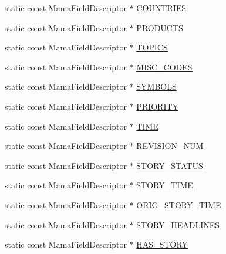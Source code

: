 \begin{CompactItemize}
\item 
static const Mama\-Field\-Descriptor $\ast$ \hyperlink{classWombat_1_1MamdaNewsFields_f8824103cdea9bf6ae34673a62955275}{COUNTRIES}
\item 
static const Mama\-Field\-Descriptor $\ast$ \hyperlink{classWombat_1_1MamdaNewsFields_2c2cb7d80e836bbde40631da69c58887}{PRODUCTS}
\item 
static const Mama\-Field\-Descriptor $\ast$ \hyperlink{classWombat_1_1MamdaNewsFields_03e2ddbd4bf6bd7ff68b52d72f7c8bcf}{TOPICS}
\item 
static const Mama\-Field\-Descriptor $\ast$ \hyperlink{classWombat_1_1MamdaNewsFields_4d1115ade8982c3ae6c7943b85cfe196}{MISC\_\-CODES}
\item 
static const Mama\-Field\-Descriptor $\ast$ \hyperlink{classWombat_1_1MamdaNewsFields_d2db952ef984a7055275f9164ab1f2c8}{SYMBOLS}
\item 
static const Mama\-Field\-Descriptor $\ast$ \hyperlink{classWombat_1_1MamdaNewsFields_4da357619e2e0495e756236c5c08425a}{PRIORITY}
\item 
static const Mama\-Field\-Descriptor $\ast$ \hyperlink{classWombat_1_1MamdaNewsFields_93e152ee3301d303ff42e424da7232af}{TIME}
\item 
static const Mama\-Field\-Descriptor $\ast$ \hyperlink{classWombat_1_1MamdaNewsFields_559780f85b60921c5499ad5e517961eb}{REVISION\_\-NUM}
\item 
static const Mama\-Field\-Descriptor $\ast$ \hyperlink{classWombat_1_1MamdaNewsFields_e04c3a74448f2e7d1c3e0aaa6aa71bf5}{STORY\_\-STATUS}
\item 
static const Mama\-Field\-Descriptor $\ast$ \hyperlink{classWombat_1_1MamdaNewsFields_03642df53d390f3f38b583d10835618d}{STORY\_\-TIME}
\item 
static const Mama\-Field\-Descriptor $\ast$ \hyperlink{classWombat_1_1MamdaNewsFields_56f1c133ce486a2b6e039078b96e7f74}{ORIG\_\-STORY\_\-TIME}
\item 
static const Mama\-Field\-Descriptor $\ast$ \hyperlink{classWombat_1_1MamdaNewsFields_c4689e31efe37e48eb0ea0b07d5a3fe2}{STORY\_\-HEADLINES}
\item 
static const Mama\-Field\-Descriptor $\ast$ \hyperlink{classWombat_1_1MamdaNewsFields_52ac5cca6c5f2a918a7ab411e6cf0fd0}{HAS\_\-STORY}
\end{CompactItemize}


